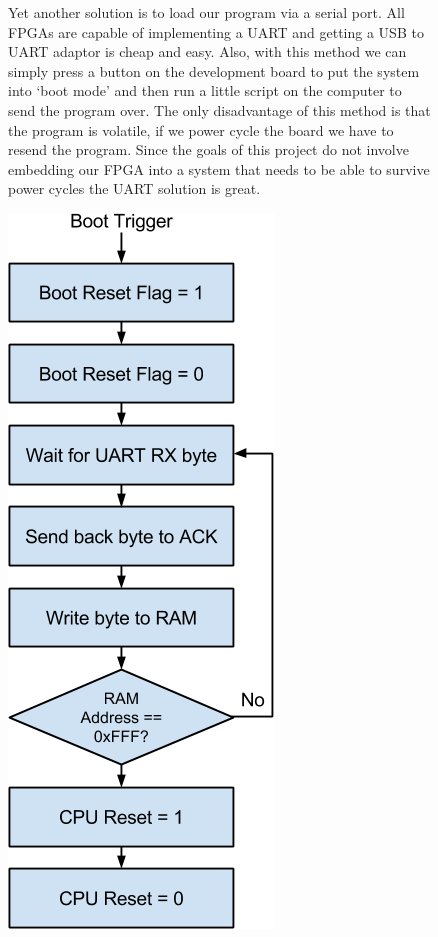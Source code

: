 \documentclass[10pt]{article}
\begin{document}
\begin{figure}[H]
\begin{minipage}[t]{.6\textwidth}
                \vspace{\baselineskip}
                Yet another solution is to load our program via a serial port.
                All FPGAs are capable of implementing a UART and getting a USB
                to UART adaptor is cheap and easy. Also, with this method we
                can simply press a button on the development board to put the
                system into `boot mode' and then run a little script on the
                computer to send the program over.  The only disadvantage of
                this method is that the program is volatile, if we power cycle
                the board we have to resend the program. Since the goals of
                this project do not involve embedding our FPGA into a system
                that needs to be able to survive power cycles the UART solution
                is great.
            \end{minipage}%
            \begin{minipage}[t]{.4\textwidth}
                \vspace{0pt}
                \centering
                \includegraphics[width=0.65\linewidth]{./bootloader.png}

\end{minipage}
\end{figure}
\end{document}
